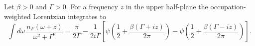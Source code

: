 \documentclass{article}
\begin{document}
Let $\beta>0$ and $\Gamma>0$. For a frequency $z$ in the upper half-plane the occupation-weighted Lorentzian integrates to
\begin{equation}
\int d\omega\, \frac{n_F(\omega+z)}{\omega^2+\Gamma^2} = \frac{\pi}{2\Gamma} - \frac{1}{2i\Gamma}\left[\psi\left(\frac{1}{2}+\frac{\beta(\Gamma+i z)}{2\pi}\right)-\psi\left(\frac{1}{2}+\frac{\beta(\Gamma-i z)}{2\pi}\right)\right] .
\label{eq:z}
\end{equation}
\end{document}
